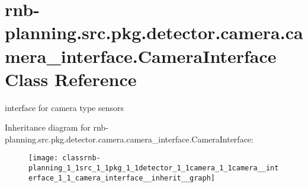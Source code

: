 \hypertarget{classrnb-planning_1_1src_1_1pkg_1_1detector_1_1camera_1_1camera__interface_1_1_camera_interface}{}\section{rnb-\/planning.src.\+pkg.\+detector.\+camera.\+camera\+\_\+interface.\+Camera\+Interface Class Reference}
\label{classrnb-planning_1_1src_1_1pkg_1_1detector_1_1camera_1_1camera__interface_1_1_camera_interface}


interface for camera type sensors  




Inheritance diagram for rnb-\/planning.src.\+pkg.\+detector.\+camera.\+camera\+\_\+interface.\+Camera\+Interface\+:\nopagebreak
\begin{figure}[H]
\begin{center}
\leavevmode
\texttt{[image: classrnb-planning\_1\_1src\_1\_1pkg\_1\_1detector\_1\_1camera\_1\_1camera\_\_interface\_1\_1\_camera\_interface\_\_inherit\_\_graph]}
\end{center}
\end{figure}
